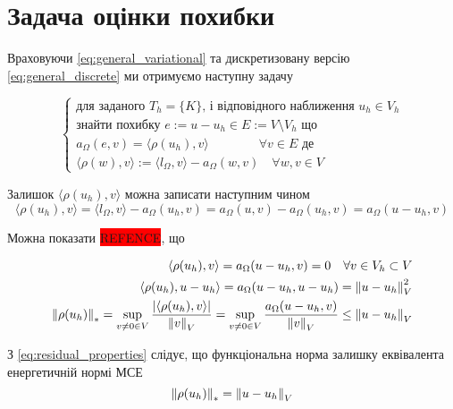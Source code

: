 
\section{Задача оцінки похибки}

Враховуючи
\eqref{eq:general_variational} та дискретизовану версію
\eqref{eq:general_discrete} ми отримуємо наступну задачу

\begin{equation}\label{eq:AE_problem}
	\begin{cases}
		\mbox{для заданого } T_h=\{K\} \text{, і відповідного наближення } u_h \in V_h \\
		\text{знайти похибку } e:=u-u_h \in E := V \setminus V_h \text{ що} \\
		a_\Omega(e,v) = \langle\rho(u_h), v\rangle \qquad \qquad \forall v \in E \text{ де}\\
		\langle\rho(w), v\rangle := \langle l_\Omega, v\rangle - a_\Omega(w, v) \quad \forall w,v \in V
	\end{cases}
\end{equation}

Залишок $\langle\rho(u_h), v\rangle$ можна записати наступним чином
\begin{equation*}
	\langle\rho(u_h), v\rangle
		= \langle l_\Omega, v\rangle - a_\Omega(u_h, v)
		= a_\Omega(u,v)-a_\Omega(u_h, v) = a_\Omega(u-u_h, v)
\end{equation*}

Можна показати \colorbox{red}{REFENCE}, що

\begin{equation}\label{eq:residual_properties}
	\begin{split}
		\langle\rho(u_h), v\rangle = a_\Omega(u-u_h, v) = 0 \quad \forall v \in V_h \subset V \\
		\langle\rho(u_h), u-u_h\rangle = a_\Omega(u-u_h, u-u_h) = \left\lVert u-u_h\right\rVert^2_V \\
		\left\lVert\rho(u_h)\right\rVert_* = \sup \limits_{v \ne 0 \in V} \frac{|\langle\rho(u_h), v\rangle|}{\left\lVert v\right\rVert_V} =
			\sup \limits_{v \ne 0 \in V} \frac{a_\Omega(u-u_h, v)}{\left\lVert v\right\rVert_V} \le \left\lVert u-u_h\right\rVert_V
	\end{split}
\end{equation}

З
\eqref{eq:residual_properties} слідує, що функціональна норма залишку еквівалента енергетичній нормі МСЕ
\begin{equation}
	\left\lVert\rho(u_h)\right\rVert_* = \left\lVert u-u_h\right\rVert_V
\end{equation}


